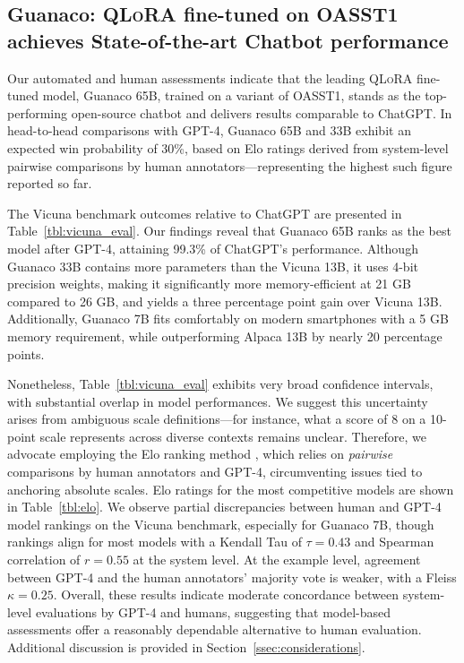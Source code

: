 \subsection{\textbf{Guanaco}: \textsc{QLoRA} fine-tuned on OASST1 achieves State-of-the-art Chatbot performance} Our automated and human assessments indicate that the leading \textsc{QLoRA} fine-tuned model, {Guanaco} 65B, trained on a variant of OASST1, stands as the top-performing open-source chatbot and delivers results comparable to ChatGPT. In head-to-head comparisons with GPT-4, {Guanaco} 65B and 33B exhibit an expected win probability of 30\%, based on Elo ratings derived from system-level pairwise comparisons by human annotators—representing the highest such figure reported so far.

The Vicuna benchmark \cite{vicuna2023} outcomes relative to ChatGPT are presented in Table~\ref{tbl:vicuna_eval}. Our findings reveal that {Guanaco} 65B ranks as the best model after GPT-4, attaining 99.3\% of ChatGPT’s performance. Although {Guanaco} 33B contains more parameters than the Vicuna 13B, it uses 4-bit precision weights, making it significantly more memory-efficient at 21 GB compared to 26 GB, and yields a three percentage point gain over Vicuna 13B. Additionally, {Guanaco} 7B fits comfortably on modern smartphones with a 5 GB memory requirement, while outperforming Alpaca 13B by nearly 20 percentage points.

Nonetheless, Table~\ref{tbl:vicuna_eval} exhibits very broad confidence intervals, with substantial overlap in model performances. We suggest this uncertainty arises from ambiguous scale definitions—for instance, what a score of 8 on a 10-point scale represents across diverse contexts remains unclear. Therefore, we advocate employing the Elo ranking method \citep{elo1967proposed}, which relies on \textit{pairwise} comparisons by human annotators and GPT-4, circumventing issues tied to anchoring absolute scales. Elo ratings for the most competitive models are shown in Table~\ref{tbl:elo}. We observe partial discrepancies between human and GPT-4 model rankings on the Vicuna benchmark, especially for Guanaco 7B, though rankings align for most models with a Kendall Tau of $\tau=0.43$ and Spearman correlation of $r=0.55$ at the system level. At the example level, agreement between GPT-4 and the human annotators’ majority vote is weaker, with a Fleiss $\kappa=0.25$. Overall, these results indicate moderate concordance between system-level evaluations by GPT-4 and humans, suggesting that model-based assessments offer a reasonably dependable alternative to human evaluation. Additional discussion is provided in Section~\ref{ssec:considerations}.

